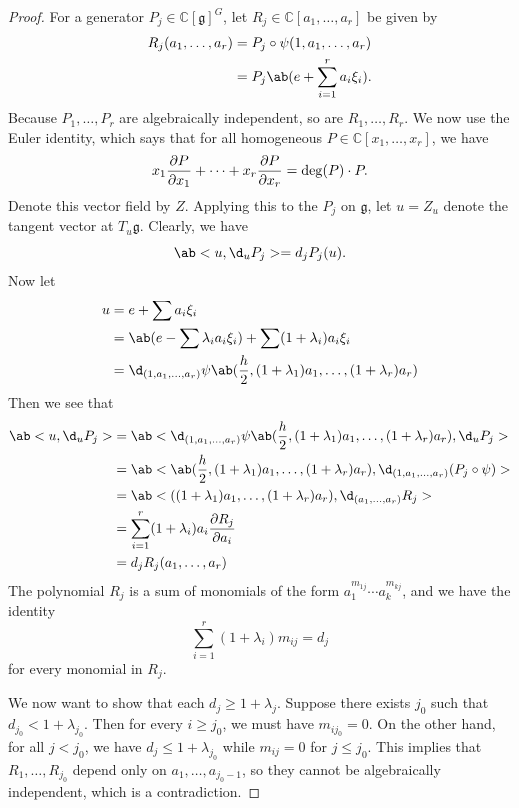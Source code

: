 \documentclass{amsart}
\theoremstyle{definition}
\theoremstyle{remark}
\theoremstyle{plain}
\theoremstyle{definition}
\theoremstyle{remark}
\newcommand{\C}{\mathbb{C}}
\newcommand{\g}{\mathfrak{g}}
\newcommand{\1}{\mathbf{1}}
\newcommand{\2}{\mathbf{2}}
\newcommand{\3}{\mathbf{3}}
\begin{document}
\begin{proof}
    For a generator \(P_j \in \C[\g]^G\), let \(R_j \in \C[a_1, \ldots, a_r]\) be given by
    \begin{align*}
        R_j (a_1, \ldots, a_r) &= P_j \circ \psi (1, a_1, \ldots, a_r) \\
        &= P_j \ab(e + \sum_{i=1}^r a_i \xi_i).
    \end{align*}
    Because \(P_1, \ldots, P_r\) are algebraically independent, so are \(R_1, \ldots, R_r\). We now use the Euler identity, which says that for all homogeneous \(P \in \C[x_1, \ldots, x_r]\), we have
    \[ x_1 \pdv{P}{x_1} + \cdots + x_r \pdv{P}{x_r} = \deg (P) \cdot P. \]
    Denote this vector field by \(Z\).
    Applying this to the \(P_j\) on \(\g\), let \(u = Z_u \) denote the tangent vector at \(T_u \g\). Clearly, we have
    \[ \ab<u, \d_u P_j> = d_j P_j(u). \]
    Now let
    \begin{align*}
        u &= e + \sum a_i \xi_i \\
        &= \ab(e - \sum \lambda_i a_i \xi_i) + \sum (1 + \lambda_i) a_i \xi_i \\
        &= \d_{(1, a_1, \ldots, a_r)} \psi \ab(\frac{h}{2}, (1+\lambda_1) a_1, \ldots, (1+\lambda_r) a_r)
    \end{align*}
    Then we see that
    \begin{align*}
        \ab< u, \d_u P_j> &= \ab<\d_{(1, a_1, \ldots, a_r)} \psi \ab(\frac{h}{2}, (1+\lambda_1) a_1, \ldots, (1+\lambda_r) a_r), \d_u P_j> \\
        &= \ab< \ab(\frac{h}{2}, (1+\lambda_1) a_1, \ldots, (1+\lambda_r) a_r), \d_{(1, a_1, \ldots, a_r)} (P_j \circ \psi)> \\
        &= \ab< ((1 + \lambda_1) a_1, \ldots, (1+\lambda_r) a_r), \d_{(a_1, \ldots, a_r)} R_j> \\
        &= \sum_{i=1}^r (1 + \lambda_i) a_i \pdv{R_j}{a_i} \\
        &= d_j R_j(a_1, \ldots, a_r)
    \end{align*}
    The polynomial \(R_j\) is a sum of monomials of the form \(a_1^{m_{1j}} \cdots a_k^{m_{kj}}\), and we have the identity
    \[ \sum_{i=1}^r (1 + \lambda_i) m_{ij} = d_j \]
    for every monomial in \(R_j\).

    We now want to show that each \(d_j \geq 1 + \lambda_j\). Suppose there exists \(j_0\) such that \(d_{j_0} < 1 + \lambda_{j_0}\). Then for every \(i \geq j_0\), we must have \(m_{ij_0} = 0\). On the other hand, for all \(j < j_0\), we have \(d_j \leq 1 + \lambda_{j_0}\) while \(m_{ij} = 0\) for \(j \leq j_0\). This implies that \(R_1, \ldots, R_{j_0}\) depend only on \(a_1, \ldots, a_{j_0-1}\), so they cannot be algebraically independent, which is a contradiction.


\end{proof}
\end{document}
